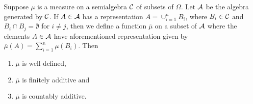 \begin{theorem}
    Suppose $\mu$ is a measure on a semialgebra ${\cal C}$ of subsets of $\Omega$. Let ${\cal A}$ be the algebra generated by ${\cal C}$. If $A\in {\cal A}$ has a representation $A=\cup_{i=1}^{n} B_i$, where $B_i \in {\cal C}$ and $B_i \cap B_j = \emptyset$ for $i\ne j$, then we define a function $\overline \mu $ on a subset of ${\cal A}$ where the elements $A\in {\cal A}$ have aforementioned representation given by $\overline{\mu} (A) = \sum_{i=1}^{n} \mu (B_i)$. Then
    \begin{enumerate}
	\item $\overline \mu$ is well defined,
	\item $\overline \mu$ is finitely additive and
	\item $\overline \mu$ is countably additive.
    \end{enumerate}
    \label{thm:extension-semialgebra-algebra}
\end{theorem}
